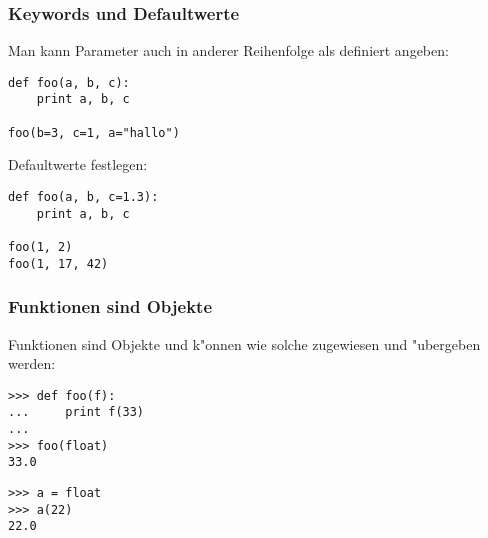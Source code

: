 \begin{frame}[fragile]
\frametitle{Keywords und Defaultwerte}
Man kann Parameter auch in anderer Reihenfolge als definiert angeben:
\begin{lstlisting}[style=Python]
def foo(a, b, c):
    print a, b, c

foo(b=3, c=1, a="hallo")
\end{lstlisting}
Defaultwerte festlegen:
\begin{lstlisting}[style=Python]
def foo(a, b, c=1.3):
    print a, b, c

foo(1, 2)
foo(1, 17, 42)
\end{lstlisting}
\end{frame}

\begin{frame}[fragile]
\frametitle{Funktionen sind Objekte}
Funktionen sind Objekte und k"onnen wie solche zugewiesen und "ubergeben werden:
\begin{lstlisting}[style=Shell]
>>> def foo(f):
...     print f(33)
...
>>> foo(float)
33.0
\end{lstlisting}
\begin{lstlisting}[style=Shell]
>>> a = float
>>> a(22)
22.0
\end{lstlisting}
\end{frame}

